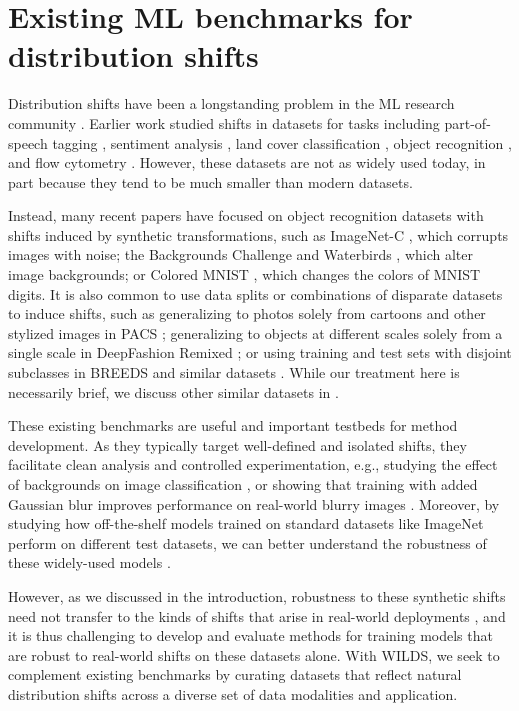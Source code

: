 \section{Existing ML benchmarks for distribution shifts}\label{sec:related}
Distribution shifts have been a longstanding problem in the ML research community \citep{hand2006classifier,quinonero2009dataset}. Earlier work studied shifts in datasets for tasks including
part-of-speech tagging \citep{marcus93treebank},
sentiment analysis \citep{blitzer2007biographies},
land cover classification \citep{bruzzone2009domain},
object recognition \citep{saenko2010adapting},
and flow cytometry \citep{blanchard2011generalizing}.
However, these datasets are not as widely used today, in part because they tend to be much smaller than modern datasets.

Instead, many recent papers have focused on object recognition datasets with shifts induced by synthetic transformations, such as
ImageNet-C \citep{hendrycks2019benchmarking}, which corrupts images with noise;
the Backgrounds Challenge \citep{xiao2020noise} and Waterbirds \citep{sagawa2020group}, which alter image backgrounds;
or Colored MNIST \citep{arjovsky2019invariant}, which changes the colors of MNIST digits.
It is also common to use data splits or combinations of disparate datasets to induce shifts, such as generalizing to photos solely from cartoons and other stylized images in PACS \citep{li2017deeper}; generalizing to objects at different scales solely from a single scale in DeepFashion Remixed \citep{hendrycks2020many}; or using training and test sets with disjoint subclasses in BREEDS \citep{santurkar2020breeds} and similar datasets \citep{hendrycks2019benchmarking}. While our treatment here is necessarily brief, we discuss other similar datasets in .

These existing benchmarks are useful and important testbeds for method development.
As they typically target well-defined and isolated shifts,
they facilitate clean analysis and controlled experimentation,
e.g., studying the effect of backgrounds on image classification \citep{xiao2020noise}, or showing that training with added Gaussian blur improves performance on real-world blurry images \citep{hendrycks2020many}.
Moreover, by studying how off-the-shelf models trained on standard datasets like ImageNet perform on different test datasets, we can better understand the robustness of these widely-used models
\citep{geirhos2018generalisation, recht2019doimagenet, hendrycks2019benchmarking, taori2020measuring, djolonga2020robustness, hendrycks2020many}.

However, as we discussed in the introduction, robustness to these synthetic shifts need not transfer to the kinds of shifts that arise in real-world deployments \citep{taori2020measuring,djolonga2020robustness,xie2020innout},
and it is thus challenging to develop and evaluate methods for training models that are robust to real-world shifts on these datasets alone.
With WILDS, we seek to complement existing benchmarks by curating datasets that reflect natural distribution shifts across a diverse set of data modalities and application.
